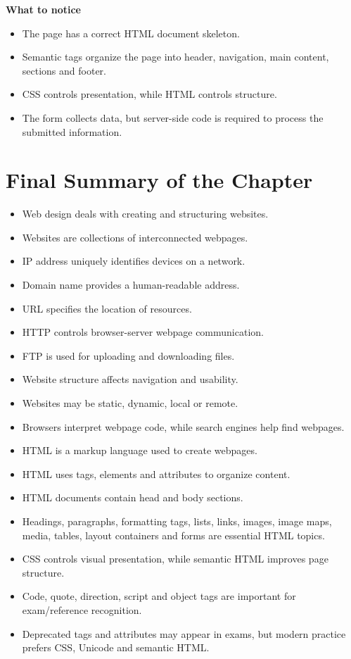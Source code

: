 \textbf{What to notice}
\begin{itemize}
    \item The page has a correct HTML document skeleton.
    \item Semantic tags organize the page into header, navigation, main content, sections and footer.
    \item CSS controls presentation, while HTML controls structure.
    \item The form collects data, but server-side code is required to process the submitted information.
\end{itemize}

\section{Final Summary of the Chapter}

\begin{summarybox}
\begin{itemize}
    \item Web design deals with creating and structuring websites.
    \item Websites are collections of interconnected webpages.
    \item IP address uniquely identifies devices on a network.
    \item Domain name provides a human-readable address.
    \item URL specifies the location of resources.
    \item HTTP controls browser-server webpage communication.
    \item FTP is used for uploading and downloading files.
    \item Website structure affects navigation and usability.
    \item Websites may be static, dynamic, local or remote.
    \item Browsers interpret webpage code, while search engines help find webpages.
    \item HTML is a markup language used to create webpages.
    \item HTML uses tags, elements and attributes to organize content.
    \item HTML documents contain head and body sections.
    \item Headings, paragraphs, formatting tags, lists, links, images, image maps, media, tables, layout containers and forms are essential HTML topics.
    \item CSS controls visual presentation, while semantic HTML improves page structure.
    \item Code, quote, direction, script and object tags are important for exam/reference recognition.
    \item Deprecated tags and attributes may appear in exams, but modern practice prefers CSS, Unicode and semantic HTML.
\end{itemize}
\end{summarybox}
